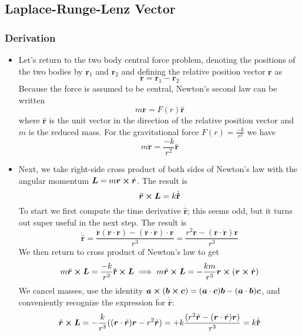 \documentclass[11pt, a4paper]{article}
\newcommand{\bdot}[1]{\dot{\bm{#1}}} %
\newcommand{\bddot}[1]{\ddot{\bm{#1}}} %
\newcommand{\uvec}[1]{\bm{\hat{\mathbf{#1}}}} %
\begin{document}
\subsection{Laplace-Runge-Lenz Vector}

\subsubsection{Derivation}
\begin{itemize}
	\item Let's return to the two body central force problem, denoting the positions of the two bodies by $ \bm{r}_{1} $ and $ \bm{r}_{2} $ and defining the relative position vector $ \bm{r} $ as
	\begin{equation*}
		\bm{r} = \bm{r}_{1} - \bm{r}_{2}
	\end{equation*}
	Because the force is assumed to be central, Newton's second law can be written
	\begin{equation*}
		m \bddot{r} = F(r) \uvec{r}
	\end{equation*}
	where $ \uvec{r} $ is the unit vector in the direction of the relative position vector and $ m $ is the reduced mass. For the gravitational force $ F(r) = \frac{-k}{r^{2}} $ we have
	\begin{equation*}
		m \bddot{r} = \frac{-k}{r^{2}} \uvec{r}
	\end{equation*}
	
	\item Next, we take right-side cross product of both sides of Newton's law with the angular momentum  $ \bm{L} = m \bm{r} \cross \bdot{r} $. The result is
	\begin{equation*}
		\bddot{r}\cross \bm{L} = k \dot{\uvec{r}}
	\end{equation*}
	To start we first compute the time derivative $ \dot{\uvec{r}} $; this seems odd, but it turns out super useful in the next step. The result is
	\begin{equation*}
		\dot{\uvec{r}} = \frac{\bdot{r}(\bm{r}\cdot \bm{r}) - (\bm{r}\cdot \bdot{r})\cdot \bm{r}}{r^{3}} = \frac{r^{2}\bdot{r} - (\bm{r}\cdot \bdot{r}) \bm{r}}{r^{3}}
	\end{equation*}
	We then return to cross product of Newton's law to get
	\begin{equation*}
		m \bddot{r}\cross \bm{L} = \frac{-k}{r^{2}} \uvec{r} \cross \bm{L} \implies m \bddot{r}\cross \bm{L} = - \frac{km}{r^{3}} \bm{r} \cross (\bm{r} \cross \bdot{r})
	\end{equation*}
	We cancel masses, use the identity $ \bm{a} \cross (\bm{b} \cross \bm{c}) = (\bm{a} \cdot \bm{c})\bm{b} - (\bm{a} \cdot \bm{b})\bm{c} $, and conveniently recognize the expression for $ \dot{\uvec{r}} $:
	\begin{equation*}
		\bddot{r}\cross \bm{L} = - \frac{k}{r^{3}}((\bm{r}\cdot \bdot{r})\bm{r} - r^{2}\bdot{r}) = +k\frac{(r^{2}\bdot{r} - (\bm{r}\cdot \bdot{r})\bm{r})}{r^{3}} = k \dot{\uvec{r}}
	\end{equation*}
	

\end{itemize}
\end{document}
